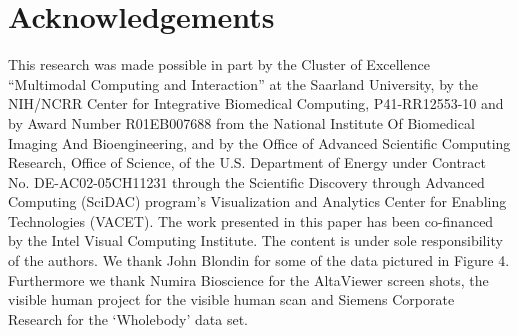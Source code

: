 \section{Acknowledgements}
This research was made possible in part by the Cluster of Excellence
``Multimodal Computing and Interaction'' at the Saarland University,
by the NIH/NCRR Center for Integrative Biomedical Computing,
P41-RR12553-10 and by Award Number R01EB007688 from the National
Institute Of Biomedical Imaging And Bioengineering, and by the Office
of Advanced Scientific Computing Research, Office of Science, of
the U.S. Department of Energy under Contract No. DE-AC02-05CH11231
through the Scientific Discovery through Advanced Computing (SciDAC)
program's Visualization and Analytics Center for Enabling Technologies
(VACET). The work presented in this paper has been co-financed by
the Intel Visual Computing Institute. The content is under sole
responsibility of the authors. We thank John Blondin for some of the
data pictured in Figure 4.  Furthermore we thank Numira Bioscience for
the AltaViewer screen shots, the visible human project for the visible
human scan and Siemens Corporate Research for the `Wholebody' data set.

